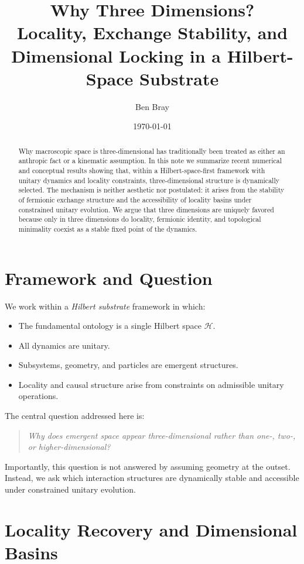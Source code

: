 \documentclass[11pt]{article}
\title{Why Three Dimensions?\\
Locality, Exchange Stability, and Dimensional Locking in a Hilbert-Space Substrate}
\author{Ben Bray}
\date{\today}
\begin{document}
\maketitle

\begin{abstract}
Why macroscopic space is three-dimensional has traditionally been treated as either an anthropic fact or a kinematic assumption. In this note we summarize recent numerical and conceptual results showing that, within a Hilbert-space-first framework with unitary dynamics and locality constraints, three-dimensional structure is dynamically selected. The mechanism is neither aesthetic nor postulated: it arises from the stability of fermionic exchange structure and the accessibility of locality basins under constrained unitary evolution. We argue that three dimensions are uniquely favored because only in three dimensions do locality, fermionic identity, and topological minimality coexist as a stable fixed point of the dynamics.
\end{abstract}

\section{Framework and Question}

We work within a \emph{Hilbert substrate} framework in which:
\begin{itemize}
    \item The fundamental ontology is a single Hilbert space $\mathcal{H}$.
    \item All dynamics are unitary.
    \item Subsystems, geometry, and particles are emergent structures.
    \item Locality and causal structure arise from constraints on admissible unitary operations.
\end{itemize}

The central question addressed here is:

\begin{quote}
\emph{Why does emergent space appear three-dimensional rather than one-, two-, or higher-dimensional?}
\end{quote}

Importantly, this question is not answered by assuming geometry at the outset. Instead, we ask which interaction structures are dynamically stable and accessible under constrained unitary evolution.

\section{Locality Recovery and Dimensional Basins}
\end{document}

